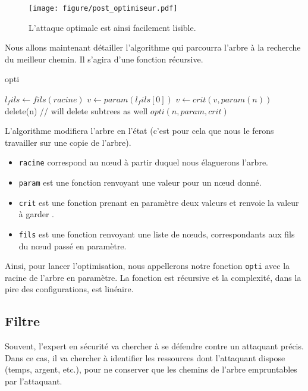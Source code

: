 		\begin{figure}[h!]
			\centering
				\texttt{[image: figure/post\_optimiseur.pdf]}
			\caption{L'attaque optimale est ainsi facilement lisible.}
			\label{fig:arbre_post_opti}
		\end{figure}
		
		
    
		
		
		Nous allons maintenant détailler l'algorithme qui parcourra l'arbre à la recherche du meilleur chemin. Il s'agira d'une fonction récursive.

		\begin{algorithm}[h!]
		\caption{opti}
		\begin{algorithmic}
			\STATE $l_fils \leftarrow fils(racine)$
				\RETURN
			\ENDIF
				\STATE $v \leftarrow param(l_fils[0])$
					\STATE $v \leftarrow crit(v, param(n))$
				\ENDFOR
						\STATE delete(n) // will delete subtrees as well
					\ENDIF
				\ENDFOR
			\ENDIF
				\STATE $opti(n, param, crit)$
			\ENDFOR

		\end{algorithmic}
		\end{algorithm}

		L'algorithme modifiera l'arbre en l'état (c'est pour cela que nous le ferons travailler sur une copie de l'arbre).
		\begin{itemize}
			\item \verb|racine| correspond au nœud à partir duquel nous élaguerons l'arbre.
			\item \verb|param| est une fonction renvoyant une valeur pour un nœud donné.
			\item \verb|crit| est une fonction prenant en paramètre deux valeurs et renvoie la valeur à \og garder \fg.
			\item \verb|fils| est une fonction renvoyant une liste de nœuds, correspondants aux fils du nœud passé en paramètre.
		\end{itemize}

		Ainsi, pour lancer l'optimisation, nous appellerons notre fonction \verb|opti| avec la racine de l'arbre en paramètre.
		La fonction est récursive et la complexité, dans la pire des configurations, est linéaire.

	\subsection{Filtre}
	\label{subsection:filtre} 
		Souvent, l'expert en sécurité va chercher à se défendre contre un attaquant précis. Dans ce cas, il va chercher à identifier les ressources dont l'attaquant dispose (temps, argent, etc.), pour ne conserver que les chemins de l'arbre empruntables par l'attaquant.

